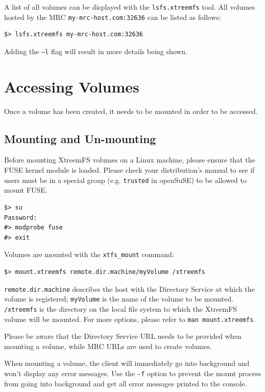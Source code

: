 \documentclass[a4paper,10pt]{book}
\begin{document}
A list of all volumes can be displayed with the \texttt{lsfs.xtreemfs} tool. All volumes hosted by the MRC \texttt{my-mrc-host.com:32636} can be listed as follows:

\begin{verbatim}
$> lsfs.xtreemfs my-mrc-host.com:32636
\end{verbatim}

Adding the \texttt{--l} flag will result in more details being shown.


\section{Accessing Volumes}
\label{sec:mount_vol}

Once a volume has been created, it needs to be mounted in order to be accessed.

\subsection{Mounting and Un-mounting}

Before mounting XtreemFS volumes on a Linux machine, please ensure that the FUSE kernel module is loaded. Please check your distribution's manual to see if users must be in a special group (e.g. \texttt{trusted} in openSuSE) to be allowed to mount FUSE.


\begin{verbatim}
$> su
Password:
#> modprobe fuse
#> exit
\end{verbatim}


Volumes are mounted with the \texttt{xtfs\_mount} command:


\begin{verbatim}
$> mount.xtreemfs remote.dir.machine/myVolume /xtreemfs
\end{verbatim}


\texttt{remote.dir.machine} describes the host with the Directory Service at which the volume is registered; \texttt{myVolume} is the name of the volume to be mounted. \texttt{/xtreemfs} is the directory on the local file system to which the XtreemFS volume will be mounted. For more options, please refer to \texttt{man mount.xtreemfs}.

Please be aware that the Directory Service URL needs to be provided when mounting a volume, while MRC URLs are used to create volumes.

When mounting a volume, the client will immediately go into background and won't display any error messages. Use the \texttt{-f} option to prevent the mount process from going into background and get all error messages printed to the console.
\end{document}
